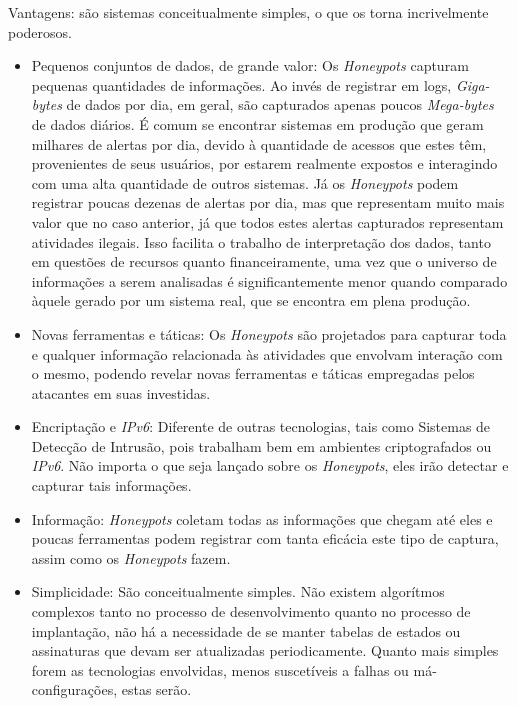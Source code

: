 Vantagens: são sistemas conceitualmente simples, o que os torna incrivelmente poderosos.
\begin{itemize}
    \item Pequenos conjuntos de dados, de grande valor: Os \textit{Honeypots} capturam pequenas quantidades de informações. Ao invés de registrar em logs, \textit{Giga-bytes} de dados por dia, em geral, são capturados apenas poucos \textit{Mega-bytes} de dados diários. É comum se encontrar sistemas em produção que geram milhares de alertas por dia, devido à quantidade de acessos que estes têm, provenientes de seus usuários, por estarem realmente expostos e interagindo com uma alta quantidade de outros sistemas. Já os \textit{Honeypots} podem registrar poucas dezenas de alertas por dia, mas que representam muito mais valor que no caso anterior, já que todos estes alertas capturados representam atividades ilegais. Isso facilita o trabalho de interpretação dos dados, tanto em questões de recursos quanto financeiramente, uma vez que o universo de informações a serem analisadas é significantemente menor quando comparado àquele gerado por um sistema real, que se encontra em plena produção.

    \item Novas ferramentas e táticas: Os \textit{Honeypots} são projetados para capturar toda e qualquer informação relacionada às atividades que envolvam interação com o mesmo, podendo revelar novas ferramentas e táticas empregadas pelos atacantes em suas investidas.

    \item Encriptação e \textit{IPv6}: Diferente de outras tecnologias, tais como Sistemas de Detecção de Intrusão, pois trabalham bem em ambientes criptografados ou \textit{IPv6}. Não importa o que seja lançado sobre os \textit{Honeypots}, eles irão detectar e capturar tais informações.

    \item Informação: \textit{Honeypots} coletam todas as informações que chegam até eles e poucas ferramentas podem registrar com tanta eficácia este tipo de captura, assim como os \textit{Honeypots} fazem.

    \item Simplicidade: São conceitualmente simples. Não existem algorítmos complexos tanto no processo de desenvolvimento quanto no processo de implantação, não há a necessidade de se manter tabelas de estados ou assinaturas que devam ser atualizadas periodicamente. Quanto mais simples forem as tecnologias envolvidas, menos suscetíveis a falhas ou má-configurações, estas serão.
\end{itemize}

